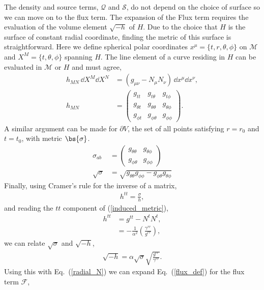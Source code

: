 The density and source terms, $\mathcal{Q}$ and $\mathcal{S}$, do not depend on the choice of surface so we can move on to the flux term. The expansion of the Flux term requires the evaluation of the volume element $\sqrt{-h}$ of $H$. Due to the choice that $H$ is the surface of constant radial coordinate, finding the metric of this surface is straightforward. Here we define spherical polar coordinates $x^\mu = \{t,r,\theta, \phi \}$ on $\mathcal{M}$ and $X^M = \{t,\theta, \phi \}$ spanning $H$. The line element of a curve residing in $H$ can be evaluated in $\mathcal{M}$ or $H$ and must agree,
\begin{align}
\label{induced_metric}h_{MN} \, \dd X^M \dd X^N &= (g_{\mu\nu} - N_\mu N_\nu) \,\dd x^\mu \dd x^\nu, \\
 h_{MN} &= \begin{pmatrix} g_{tt} & g_{t\theta} & g_{t\phi} \\ g_{\theta t} &  g_{\theta\theta}& g_{\theta\phi} \\ g_{\phi t} & g_{\phi\theta} & g_{\phi\phi} \end{pmatrix}.
\end{align}
A similar argument can be made for $\partial V$, the set of all points satisfying $r=r_0$ and $t=t_0$, with metric $\bs{\sigma}$.
\begin{align}
\label{sigma metric}\sigma_{ab} &= \begin{pmatrix} g_{\theta\theta} & g_{\theta\phi} \\ g_{\phi\theta} & g_{\phi\phi} \end{pmatrix} \\
\label{sigma det}\sqrt{\sigma}  &= \sqrt{g_{\theta\theta}g_{\phi\phi} - g_{\phi\theta}g_{\theta\phi}}
\end{align}
Finally, using Cramer's rule for the inverse of a matrix,
\begin{align}
h^{tt} = \frac{{\sigma}}{h},
\end{align}
and reading the $tt$ component of (\ref{induced_metric}), 
\begin{align}
h^{tt} &=      g^{tt} - N^t N^t, \\
               &= -\frac{1}{\alpha^2}\left(\frac{\gamma^{rr}}{g^{rr}} \right), 
\end{align}
we can relate $\sqrt{\sigma}$ and $\sqrt{-h}$,
\begin{align}
     \label{rootminushexpand}\sqrt{-h} = \alpha \sqrt{\sigma} \sqrt{\frac{g^{rr}}{\gamma^{rr}}}.
\end{align}
Using this with Eq.~(\ref{radial_N}) we can expand Eq.~(\ref{flux_def}) for the flux term $\mathcal{F}$, 
